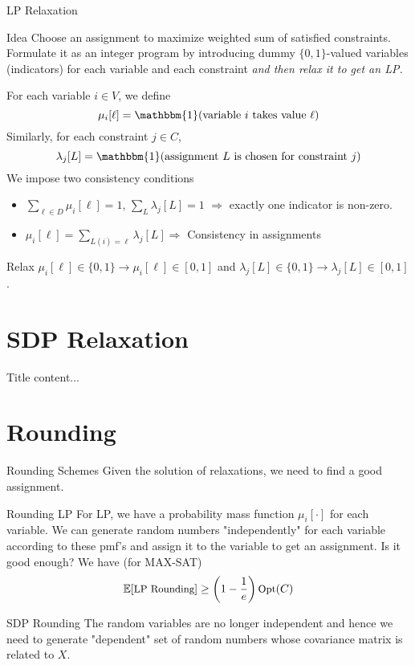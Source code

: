 \documentclass[10pt,t,compress]{beamer}
\begin{document}
\begin{frame}{LP Relaxation}
\begin{block}{Idea}
Choose an assignment to maximize weighted sum of satisfied constraints. \pause Formulate it as an integer program by introducing dummy $\{ 0, 1\}$-valued variables (indicators) for each variable and each constraint \pause \emph{ and then relax it to get an LP.}
\end{block}
\pause
 For each variable $i \in V$, we define
 \[
	 \mu_i[\ell] = \mathbbm{1}( \text{variable $i$ takes value } \ell)
 \] 
\pause  Similarly, for each constraint $j \in C$,
   \[
   \lambda_j[L] = \mathbbm{1}( \text{assignment $L$ is chosen for constraint $j$})
   \] 
\pause
We impose two consistency conditions 
 \begin{itemize}
 \item $\displaystyle\sum_{\ell \in D} \mu_i[\ell] = 1$, $\displaystyle\sum_{L} \lambda_j[L] = 1$ $\Rightarrow$ exactly one indicator is non-zero.
 \pause
 \item $\mu_i[\ell] = \displaystyle\sum_{L(i) = \ell} \lambda_j[L] \Rightarrow$ Consistency in assignments
 \end{itemize}
\pause Relax $\mu_i[\ell] \in \{ 0, 1\} \rightarrow \mu_i[\ell] \in [0, 1]$ and $\lambda_j[L] \in \{ 0, 1\} \rightarrow \lambda_j[L] \in [0, 1]$.

\end{frame}

\section{SDP Relaxation}

\begin{frame}{Title}
	content...
\end{frame}

\section{Rounding}
\begin{frame}{Rounding Schemes}
Given the solution of relaxations, we need to find a good assignment.
\pause
\begin{block}{Rounding LP}
For LP, we have a probability mass function $\mu_i[\cdot]$ for each variable. \pause We can generate random numbers "independently" for each variable according to these pmf's and assign it to the variable to get an assignment. \pause Is it good enough? \pause We have (for MAX-SAT)
\[\small \mathbb{E}[\mbox{LP Rounding}] \geq \left(1-\frac{1}{e} \right) \mbox{Opt}(C) \]
\end{block}

\pause
\begin{block}{SDP Rounding}
The random variables are no longer independent and hence we need to generate "dependent" set of random numbers whose covariance matrix is related to $X$.
\end{block}
\end{frame}
\end{document}
